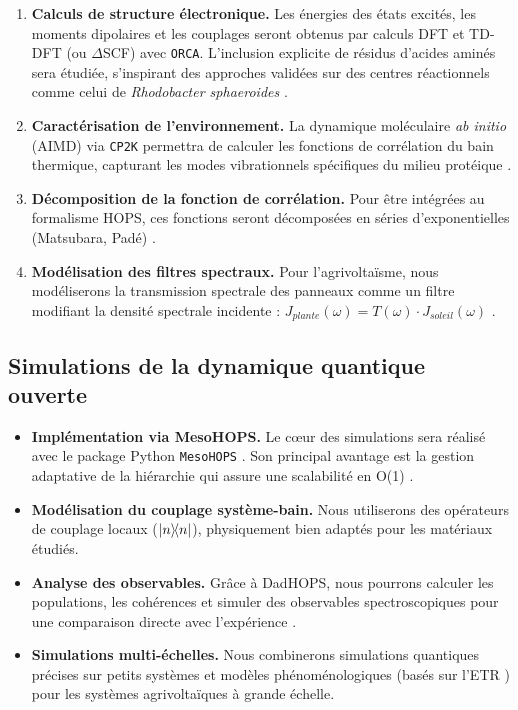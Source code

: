 \documentclass[12pt, a4paper]{article}
\begin{document}
\begin{enumerate}
    \item \textbf{Calculs de structure électronique.} Les énergies des états excités, les moments dipolaires et les couplages seront obtenus par calculs DFT et TD-DFT (ou $\Delta$SCF) avec \texttt{ORCA}. L'inclusion explicite de résidus d'acides aminés sera étudiée, s'inspirant des approches validées sur des centres réactionnels comme celui de \textit{Rhodobacter sphaeroides} \cite{Harush2023}.

    \item \textbf{Caractérisation de l'environnement.} La dynamique moléculaire \textit{ab initio} (AIMD) via \texttt{CP2K} permettra de calculer les fonctions de corrélation du bain thermique, capturant les modes vibrationnels spécifiques du milieu protéique \cite{lee2015, rangel2002}.

    \item \textbf{Décomposition de la fonction de corrélation.} Pour être intégrées au formalisme HOPS, ces fonctions seront décomposées en séries d'exponentielles (Matsubara, Padé) \cite{lambert2023, tao2020}.

    \item \textbf{Modélisation des filtres spectraux.} Pour l'agrivoltaïsme, nous modéliserons la transmission spectrale des panneaux comme un filtre modifiant la densité spectrale incidente : $J_{plante}(\omega) = T(\omega) \cdot J_{soleil}(\omega)$ \cite{Shi2025a}.
\end{enumerate}

\subsection{Simulations de la dynamique quantique ouverte}

\begin{itemize}
    \item \textbf{Implémentation via MesoHOPS.} Le cœur des simulations sera réalisé avec le package Python \texttt{MesoHOPS} \cite{Citty2024}. Son principal avantage est la gestion adaptative de la hiérarchie qui assure une scalabilité en O(1) \cite{varvelo2021}.

    \item \textbf{Modélisation du couplage système-bain.} Nous utiliserons des opérateurs de couplage locaux ($\op{n}$), physiquement bien adaptés pour les matériaux étudiés.

    \item \textbf{Analyse des observables.} Grâce à DadHOPS, nous pourrons calculer les populations, les cohérences et simuler des observables spectroscopiques pour une comparaison directe avec l'expérience \cite{Gera2023, Chen2022a}.

    \item \textbf{Simulations multi-échelles.} Nous combinerons simulations quantiques précises sur petits systèmes et modèles phénoménologiques (basés sur l'ETR \cite{ye2012}) pour les systèmes agrivoltaïques à grande échelle.
\end{itemize}
\end{document}
